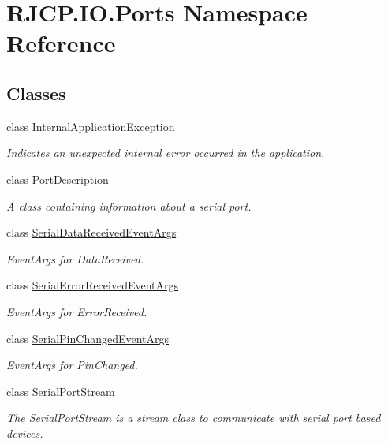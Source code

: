 \hypertarget{namespace_r_j_c_p_1_1_i_o_1_1_ports}{}\section{R\+J\+C\+P.\+I\+O.\+Ports Namespace Reference}
\label{namespace_r_j_c_p_1_1_i_o_1_1_ports}
\subsection*{Classes}
\begin{DoxyCompactItemize}
\item 
class \mbox{\hyperlink{class_r_j_c_p_1_1_i_o_1_1_ports_1_1_internal_application_exception}{Internal\+Application\+Exception}}
\begin{DoxyCompactList}\small\item\em Indicates an unexpected internal error occurred in the application. \end{DoxyCompactList}\item 
class \mbox{\hyperlink{class_r_j_c_p_1_1_i_o_1_1_ports_1_1_port_description}{Port\+Description}}
\begin{DoxyCompactList}\small\item\em A class containing information about a serial port. \end{DoxyCompactList}\item 
class \mbox{\hyperlink{class_r_j_c_p_1_1_i_o_1_1_ports_1_1_serial_data_received_event_args}{Serial\+Data\+Received\+Event\+Args}}
\begin{DoxyCompactList}\small\item\em Event\+Args for Data\+Received. \end{DoxyCompactList}\item 
class \mbox{\hyperlink{class_r_j_c_p_1_1_i_o_1_1_ports_1_1_serial_error_received_event_args}{Serial\+Error\+Received\+Event\+Args}}
\begin{DoxyCompactList}\small\item\em Event\+Args for Error\+Received. \end{DoxyCompactList}\item 
class \mbox{\hyperlink{class_r_j_c_p_1_1_i_o_1_1_ports_1_1_serial_pin_changed_event_args}{Serial\+Pin\+Changed\+Event\+Args}}
\begin{DoxyCompactList}\small\item\em Event\+Args for Pin\+Changed. \end{DoxyCompactList}\item 
class \mbox{\hyperlink{class_r_j_c_p_1_1_i_o_1_1_ports_1_1_serial_port_stream}{Serial\+Port\+Stream}}
\begin{DoxyCompactList}\small\item\em The \mbox{\hyperlink{class_r_j_c_p_1_1_i_o_1_1_ports_1_1_serial_port_stream}{Serial\+Port\+Stream}} is a stream class to communicate with serial port based devices. \end{DoxyCompactList}\end{DoxyCompactItemize}
